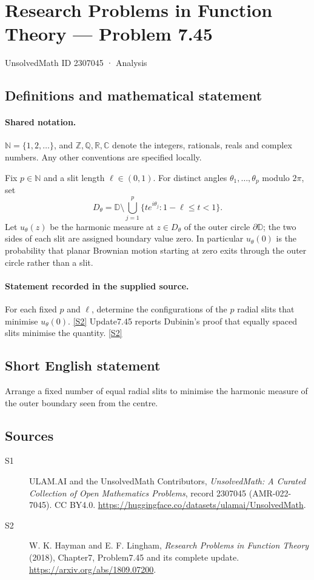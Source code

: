 \documentclass[11pt]{article}
\newcommand{\sref}[2]{\hyperlink{source:#1:#2}{[S#2]}}
\begin{document}
\setcounter{section}{2307044}
\section{Research Problems in Function Theory — Problem 7.45}\label{2307045}
{\small\sffamily UnsolvedMath ID 2307045 · Analysis}
\subsection{Definitions and mathematical statement}

\paragraph{Shared notation.}$\mathbb N=\{1,2,\ldots\}$, and $\mathbb Z,\mathbb Q,\mathbb R,\mathbb C$ denote the integers, rationals, reals and complex numbers. Any other conventions are specified locally.


Fix $p\in\mathbb N$ and a slit length $\ell\in(0,1)$. For distinct angles $\theta_1,\ldots,\theta_p$ modulo $2\pi$, set
\[D_\theta=\mathbb D\setminus\bigcup_{j=1}^p\{te^{i\theta_j}:1-\ell\le t<1\}.\]
Let $u_\theta(z)$ be the harmonic measure at $z\in D_\theta$ of the outer circle $\partial\mathbb D$; the two sides of each slit are assigned boundary value zero. In particular $u_\theta(0)$ is the probability that planar Brownian motion starting at zero exits through the outer circle rather than a slit.

\paragraph{Statement recorded in the supplied source.}
For each fixed $p$ and $\ell$, determine the configurations of the $p$ radial slits that minimise $u_\theta(0)$. \sref{2307045}{2}
Update7.45 reports Dubinin's proof that equally spaced slits minimise the quantity. \sref{2307045}{2}
\subsection{Short English statement}
Arrange a fixed number of equal radial slits to minimise the harmonic measure of the outer boundary seen from the centre.
\subsection{Sources}
\begin{description}
\item[\hypertarget{source:2307045:1}{S1}] ULAM.AI and the UnsolvedMath Contributors, \emph{UnsolvedMath: A Curated Collection of Open Mathematics Problems}, record 2307045 (AMR-022-7045). CC BY4.0. \url{https://huggingface.co/datasets/ulamai/UnsolvedMath}.
\item[\hypertarget{source:2307045:2}{S2}] W. K. Hayman and E. F. Lingham, \emph{Research Problems in Function Theory} (2018), Chapter7, Problem7.45 and its complete update. \url{https://arxiv.org/abs/1809.07200}.
\end{description}
\label{end:2307045}
\end{document}
